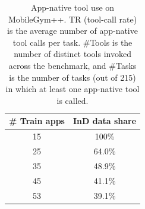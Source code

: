 \begin{table}[h]
\centering
\small
\begin{minipage}[t]{0.33\linewidth}
\centering
\caption{
Environment-coverage settings under a fixed budget of 2K trajectories. InD share denotes the fraction of training trajectories from the 15 in-distribution applications.
}
\label{tab:env-split}
\setlength{\tabcolsep}{3pt}
\begin{tabular}{cc}
\toprule
\# Train apps & InD data share \\
\midrule
15 & 100\% \\
25 & 64.0\% \\
35 & 48.9\% \\
45 & 41.1\% \\
53 & 39.1\% \\
\bottomrule
\end{tabular}
\end{minipage}
\hfill
\begin{minipage}[t]{0.63\linewidth}
\centering
\caption{App-native tool use on MobileGym++.
TR (tool-call rate) is the average number of app-native tool calls per task. \#Tools is the number of distinct tools invoked across the benchmark, and \#Tasks is the number of tasks (out of 215) in which at least one app-native tool is called.}


\label{tab:tool_use}
\setlength{\tabcolsep}{3pt}
\end{minipage}
\end{table}


